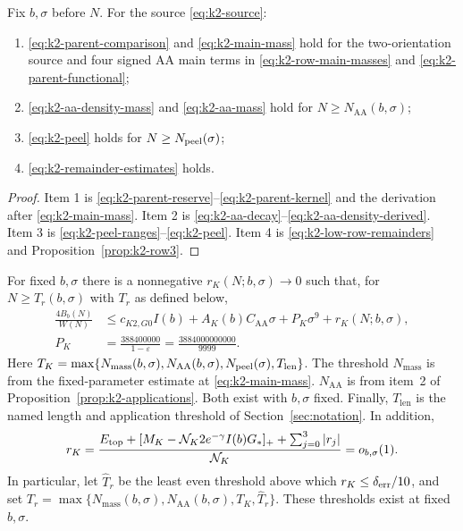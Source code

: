 \begin{proposition}\label{prop:k2-applications}
Fix \(b,\sigma\) before \(N\). For the source \eqref{eq:k2-source}:
\begin{enumerate}
 \item \eqref{eq:k2-parent-comparison} and \eqref{eq:k2-main-mass} hold
 for the two-orientation source and four signed AA main terms in
 \eqref{eq:k2-row-main-masses} and \eqref{eq:k2-parent-functional};
 \item \eqref{eq:k2-aa-density-mass} and \eqref{eq:k2-aa-mass} hold for
 \(N\ge N_{\mathrm{AA}}(b,\sigma)\);
 \item \eqref{eq:k2-peel} holds for \(N\ge N_{\rm peel}(\sigma)\);
 \item \eqref{eq:k2-remainder-estimates} holds.
\end{enumerate}
\end{proposition}

\begin{proof}
Item 1 is \eqref{eq:k2-parent-reserve}--\eqref{eq:k2-parent-kernel} and the
derivation after \eqref{eq:k2-main-mass}. Item 2 is
\eqref{eq:k2-aa-decay}--\eqref{eq:k2-aa-density-derived}. Item 3 is
\eqref{eq:k2-peel-ranges}--\eqref{eq:k2-peel}. Item 4 is
\eqref{eq:k2-low-row-remainders} and Proposition~\ref{prop:k2-row3}.
\end{proof}


\begin{proposition}\label{prop:k2-comparison}
For fixed \(b,\sigma\) there is a nonnegative \(r_K(N;b,\sigma)\to0\) such
that, for \(N\ge T_r(b,\sigma)\) with \(T_r\) as defined below,
\begin{equation}\label{eq:k2-final-fixed-sigma}
\begin{aligned}
 \frac{4B_b(N)}{W(N)}
 &\le c_{K2,G0}I(b)+A_K(b)C_{\mathrm{AA}}\sigma
          +P_K\sigma^9+r_K(N;b,\sigma),\\
 P_K&=\frac{388400000}{1-\varepsilon}
     =\frac{3884000000000}{9999}.
\end{aligned}
\end{equation}
Here
\(T_K=\max\{N_{\mathrm{mass}}(b,\sigma),N_{\mathrm{AA}}(b,\sigma),
N_{\rm peel}(\sigma),T_{\mathrm{len}}\}\). The threshold \(N_{\mathrm{mass}}\) is from
the fixed-parameter estimate at \eqref{eq:k2-main-mass}.
\(N_{\mathrm{AA}}\) is from
item~2 of Proposition~\ref{prop:k2-applications}. Both exist with
\(b,\sigma\) fixed. Finally, \(T_{\mathrm{len}}\) is the named length and
application threshold of Section~\ref{sec:notation}. In addition,
\begin{equation}\label{eq:k2-error-definition}
 r_K=\frac{E_{\rm top}+[M_K-\mathcal N_K2e^{-\gamma}I(b)G_*]_+
 +\sum_{j=0}^3|r_j|}{\mathcal N_K}
 =o_{b,\sigma}(1).
\end{equation}
In particular, let \(\widehat T_r\) be the least even threshold above
which \(r_K\le\delta_{\rm err}/10\), and set
\(T_r=\max\{N_{\mathrm{mass}}(b,\sigma),N_{\mathrm{AA}}(b,\sigma),
T_K,\widehat T_r\}\).
These thresholds exist at fixed \(b,\sigma\).
\end{proposition}

